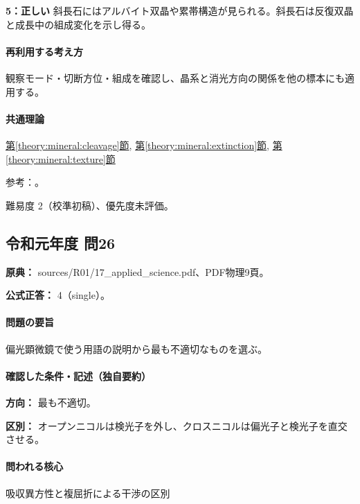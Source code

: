 \noindent\textbf{5：正しい} 斜長石にはアルバイト双晶や累帯構造が見られる。斜長石は反復双晶と成長中の組成変化を示し得る。\par

\paragraph{再利用する考え方} 観察モード・切断方位・組成を確認し、晶系と消光方向の関係を他の標本にも適用する。

\paragraph{共通理論} \hyperref[theory:mineral:cleavage]{第\ref*{theory:mineral:cleavage}節}, \hyperref[theory:mineral:extinction]{第\ref*{theory:mineral:extinction}節}, \hyperref[theory:mineral:texture]{第\ref*{theory:mineral:texture}節}

\par 参考：\cite{nelson_inosilicates,nelson_biaxial,hom_albite}。

\par 難易度 2（校準初稿）、優先度未評価。

\subsection{令和元年度 問26}
\label{q:r01-reg-applied-26}

\noindent\textbf{原典：} sources/R01/17\_applied\_science.pdf、PDF物理9頁。

\textbf{公式正答：} 4（single）。

\paragraph{問題の要旨} 偏光顕微鏡で使う用語の説明から最も不適切なものを選ぶ。

\paragraph{確認した条件・記述（独自要約）}\mbox{}\par

\noindent\textbf{方向：} 最も不適切。\par

\noindent\textbf{区別：} オープンニコルは検光子を外し、クロスニコルは偏光子と検光子を直交させる。\par

\paragraph{問われる核心} 吸収異方性と複屈折による干渉の区別

